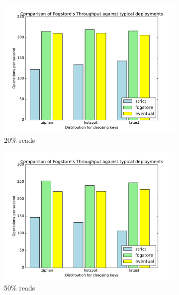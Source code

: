 \begin{figure}[t]
  \centering
  \begin{subfigure}[b]{0.32\linewidth}
    \includegraphics[width=\linewidth]{figures/fogstore/evals/stress-tests/0.2/tmp.pdf}
    \caption{20\% reads}
  \end{subfigure}
  \begin{subfigure}[b]{0.32\linewidth}
    \includegraphics[width=\linewidth]{figures/fogstore/evals/stress-tests/0.5/tmp.pdf}
    \caption{50\% reads}
  \end{subfigure}
  \begin{subfigure}[b]{0.32\linewidth}

\end{subfigure}
\end{figure}

